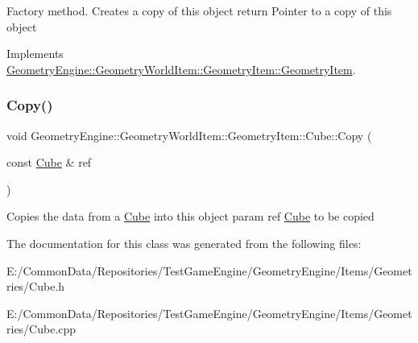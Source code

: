 Factory method. Creates a copy of this object return Pointer to a copy of this object 

Implements \mbox{\hyperlink{class_geometry_engine_1_1_geometry_world_item_1_1_geometry_item_1_1_geometry_item_a1db8f97339ba49f746b3e0b4c4b02748}{Geometry\+Engine\+::\+Geometry\+World\+Item\+::\+Geometry\+Item\+::\+Geometry\+Item}}.

\mbox{\label{class_geometry_engine_1_1_geometry_world_item_1_1_geometry_item_1_1_cube_a36f20733aaadc9ab22a72eb87436b900}} 
\subsubsection{\texorpdfstring{Copy()}{Copy()}}
{\footnotesize\ttfamily void Geometry\+Engine\+::\+Geometry\+World\+Item\+::\+Geometry\+Item\+::\+Cube\+::\+Copy (\begin{DoxyParamCaption}\item[{const \mbox{\hyperlink{class_geometry_engine_1_1_geometry_world_item_1_1_geometry_item_1_1_cube}{Cube}} \&}]{ref }\end{DoxyParamCaption})\hspace{0.3cm}{\ttfamily [virtual]}}

Copies the data from a \mbox{\hyperlink{class_geometry_engine_1_1_geometry_world_item_1_1_geometry_item_1_1_cube}{Cube}} into this object param ref \mbox{\hyperlink{class_geometry_engine_1_1_geometry_world_item_1_1_geometry_item_1_1_cube}{Cube}} to be copied 

The documentation for this class was generated from the following files\+:\begin{DoxyCompactItemize}
\item 
E\+:/\+Common\+Data/\+Repositories/\+Test\+Game\+Engine/\+Geometry\+Engine/\+Items/\+Geometries/Cube.\+h\item 
E\+:/\+Common\+Data/\+Repositories/\+Test\+Game\+Engine/\+Geometry\+Engine/\+Items/\+Geometries/Cube.\+cpp\end{DoxyCompactItemize}
